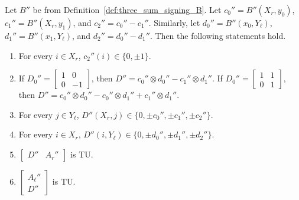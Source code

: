 \begin{lemma}\label{lem:three_sum_signing_B_props}
    Let $B''$ be from Definition~\ref{def:three_sum_signing_B}. Let $c_{0}'' = B'' (X_{r}, y_{0})$, $c_{1}'' = B'' (X_{r}, y_{1})$, and $c_{2}'' = c_{0}'' - c_{1}''$. Similarly, let $d_{0}'' = B'' (x_{0}, Y_{\ell})$, $d_{1}'' = B'' (x_{1}, Y_{\ell})$, and $d_{2}'' = d_{0}'' - d_{1}''$. Then the following statements hold.
    \begin{enumerate}
        \item\label{item:tss_Bp_c2} For every $i \in X_{r}$, $c_{2}'' (i) \in \{0, \pm 1\}$.
        \item\label{item:tss_Bp_Deq} If $D_{0}'' = \begin{bmatrix} 1 & 0 \\ 0 & -1 \end{bmatrix}$, then $D'' = c_{0}'' \otimes d_{0}'' - c_{1}'' \otimes d_{1}''$. If $D_{0}'' = \begin{bmatrix} 1 & 1 \\ 0 & 1 \end{bmatrix}$, then $D'' = c_{0}'' \otimes d_{0}'' - c_{0}'' \otimes d_{1}'' + c_{1}'' \otimes d_{1}''$.
        \item\label{item:tss_Bp_Dcols} For every $j \in Y_{\ell}$, $D'' (X_{r}, j) \in \{0, \pm c_{0}'', \pm c_{1}'', \pm c_{2}''\}$.
        \item\label{item:tss_Bp_Drows} For every $i \in X_{r}$, $D'' (i, Y_{\ell}) \in \{0, \pm d_{0}'', \pm d_{1}'', \pm d_{2}''\}$.
        \item\label{item:tss_Bp_DAr} $\begin{bmatrix} D'' & A_{r}'' \end{bmatrix}$ is TU.
        \item\label{item:tss_Bp_AlD} $\begin{bmatrix} A_{\ell}'' \\ D'' \end{bmatrix}$ is TU.
    \end{enumerate}
\end{lemma}

